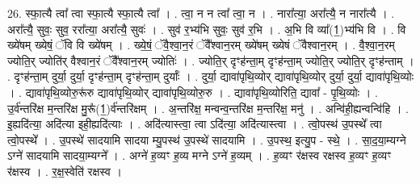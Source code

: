 \documentclass[17pt]{extarticle}
\begin{document}
26. स्फा॒त्यै त्वा᳚ त्वा स्फा॒त्यै स्फा॒त्यै त्वा᳚ । . त्वा॒ न न त्वा᳚ त्वा॒ न । . नारा᳚त्या॒ अरा᳚त्यै॒ न नारा᳚त्यै । . अरा᳚त्यै॒ सुवः॒ सुव॒ ररा᳚त्या॒ अरा᳚त्यै॒ सुवः॑ । . सुव॑ र॒भ्य॑भि सुवः॒ सुव॑ र॒भि । . अ॒भि वि व्या᳚(1॒)भ्य॑भि वि । . वि ख्ये॑षम् ख्येषं॒ ॅवि वि ख्ये॑षम् । . ख्ये॒षं॒ ॅवै॒श्वा॒न॒रं ॅवै᳚श्वान॒रम् ख्ये॑षम् ख्येषं ॅवैश्वान॒रम् । . वै॒श्वा॒न॒रम् ज्योति॒र् ज्योति॑र् वैश्वान॒रं ॅवै᳚श्वान॒रम् ज्योतिः॑ । . ज्योति॒र् दृꣳह॑न्ता॒म् दृꣳह॑न्ता॒म् ज्योति॒र् ज्योति॒र् दृꣳह॑न्ताम् । . दृꣳह॑न्ता॒म् दुर्या॒ दुर्या॒ दृꣳह॑न्ता॒म् दृꣳह॑न्ता॒म् दुर्याः᳚ । . दुर्या॒ द्यावा॑पृथि॒व्योर् द्यावा॑पृथि॒व्योर् दुर्या॒ दुर्या॒ द्यावा॑पृथि॒व्योः । . द्यावा॑पृथि॒व्योरु॒रू॑रु द्यावा॑पृथि॒व्योर् द्यावा॑पृथि॒व्योरु॒रु । . द्यावा॑पृथि॒व्योरिति॒ द्यावा᳚ - पृ॒थि॒व्योः । . उ॒र्व॑न्तरि॑क्ष म॒न्तरि॑क्ष मु॒रू᳚(1॒)र्व॑न्तरि॑क्षम् । . अ॒न्तरि॑क्ष॒ मन्वन्व॒न्तरि॑क्ष म॒न्तरि॑क्ष॒ मनु॑ । . अन्वि॑ही॒ह्यन्वन्वि॑हि । . इ॒ह्यदि॑त्या॒ अदि॑त्या इही॒ह्यदि॑त्याः । . अदि॑त्यास्त्वा॒ त्वा ऽदि॑त्या॒ अदि॑त्यास्त्वा । . त्वो॒पस्थ॑ उ॒पस्थे᳚ त्वा त्वो॒पस्थे᳚ । . उ॒पस्थे॑ सादयामि सादया म्यु॒पस्थ॑ उ॒पस्थे॑ सादयामि । . उ॒पस्थ॒ इत्यु॒प - स्थे॒ । . सा॒द॒या॒म्यग्ने ऽग्ने॑ सादयामि सादया॒म्यग्ने᳚ । . अग्ने॑ ह॒व्यꣳ ह॒व्य मग्ने ऽग्ने॑ ह॒व्यम् । . ह॒व्यꣳ र॑क्षस्व रक्षस्व ह॒व्यꣳ ह॒व्यꣳ र॑क्षस्व । . र॒क्ष॒स्वेति॑ रक्षस्व । \newline
\end{document}
